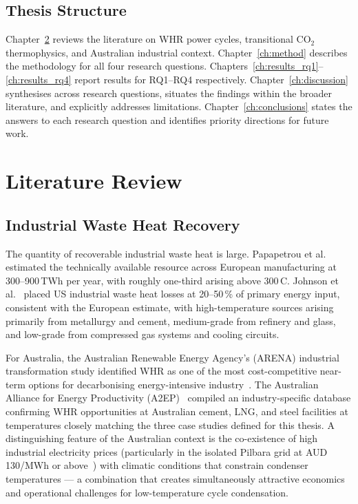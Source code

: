 \documentclass[12pt,a4paper]{report}
\begin{document}
\section{Thesis Structure}
\label{sec:structure}

Chapter~\ref{ch:litreview} reviews the literature on WHR power cycles,
transitional CO$_2$ thermophysics, and Australian industrial context.
Chapter~\ref{ch:method} describes the methodology for all four research
questions. Chapters~\ref{ch:results_rq1}--\ref{ch:results_rq4} report
results for RQ1--RQ4 respectively. Chapter~\ref{ch:discussion} synthesises
across research questions, situates the findings within the broader literature,
and explicitly addresses limitations. Chapter~\ref{ch:conclusions} states the
answers to each research question and identifies priority directions for future
work.

\chapter{Literature Review}
\label{ch:litreview}

\section{Industrial Waste Heat Recovery}
\label{sec:lit_whr}

The quantity of recoverable industrial waste heat is large. Papapetrou et
al.~\cite{Papapetrou2018} estimated the technically available resource across
European manufacturing at 300--900\,TWh per year, with roughly one-third
arising above 300\,\textdegree C. Johnson et al.~\cite{Johnson2008} placed US
industrial waste heat losses at 20--50\,\% of primary energy input, consistent
with the European estimate, with high-temperature sources arising primarily
from metallurgy and cement, medium-grade from refinery and glass, and
low-grade from compressed gas systems and cooling circuits.

For Australia, the Australian Renewable Energy Agency's (ARENA) industrial
transformation study identified WHR as one of the most cost-competitive
near-term options for decarbonising energy-intensive industry~\cite{ARENA2023}.
The Australian Alliance for Energy Productivity (A2EP)~\cite{A2EP2022}
compiled an industry-specific database confirming WHR opportunities at
Australian cement, LNG, and steel facilities at temperatures closely matching
the three case studies defined for this thesis. A distinguishing feature of
the Australian context is the co-existence of high industrial electricity
prices (particularly in the isolated Pilbara grid at AUD\,130/MWh or
above~\cite{AEMO2024}) with climatic conditions that constrain condenser
temperatures --- a combination that creates simultaneously attractive economics
and operational challenges for low-temperature cycle condensation.
\end{document}
